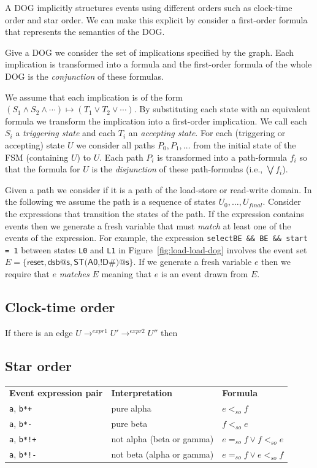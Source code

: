 \documentclass[10pt]{paper}
\newcommand{\state}[1]{\texttt{#1}}
\begin{document}
A DOG implicitly structures events using different orders such as clock-time order and star order.
%
We can make this explicit by consider a first-order formula that represents the semantics of the DOG.

Give a DOG we consider the set of implications specified by the graph.
%
Each implication is transformed into a formula and the first-order formula of the whole DOG is the \emph{conjunction} of these formulas.

We assume that each implication is of the form $(S_1 \wedge S_2 \wedge \cdots) \mapsto (T_1 \vee T_2 \vee \cdots)$.
%
By substituting each state with an equivalent formula we transform the implication into a first-order implication.
%
We call each $S_i$ a \emph{triggering state} and each $T_i$ an \emph{accepting state}.
%
For each (triggering or accepting) state $U$ we consider all paths $P_0, P_1, \dots$ from the initial state of the FSM (containing $U$) to $U$.
%
Each path $P_i$ is transformed into a path-formula $f_i$ so that the formula for $U$ is the \emph{disjunction} of these path-formulas (i.e., $\bigvee f_i$).

Given a path we consider if it is a path of the load-store or read-write domain.
%
In the following we assume the path is a sequence of states $U_0, \dots, U_{final}$.
%
Consider the expressions that transition the states of the path.
%
If the expression contains events then we generate a fresh variable that must \emph{match} at least one of the events of the expression.
%
For example, the expression \texttt{selectBE \&\& BE \&\& start = 1} between states \state{L0} and \state{L1} in Figure~\ref{fig:load-load-dog} involves the event set $E = \{\textsf{reset}, \textsf{dsb@s}, \textsf{ST(A0,!D\#)@s}\}$.
%
If we generate a fresh variable $e$ then we require that $e$ \emph{matches} $E$ meaning that $e$ is an event drawn from $E$.
%
\subsection{Clock-time order}
If there is an edge $U \rightarrow^{expr1} U' \rightarrow^{expr2} U''$ then

\subsection{Star order}

\begin{tabular}{lll}
\textbf{Event expression pair} & \textbf{Interpretation}   & \textbf{Formula} \\
\texttt{a}, \texttt{b*+}       & pure alpha                & $e <_{so} f$ \\
\texttt{a}, \texttt{b*-}       & pure beta                 & $f <_{so} e$ \\
\texttt{a}, \texttt{b*!+}      & not alpha (beta or gamma) & $e =_{so} f \vee f <_{so} e$ \\
\texttt{a}, \texttt{b*!-}      & not beta (alpha or gamma) & $e =_{so} f \vee e <_{so} f$ \\
\end{tabular}
\end{document}
